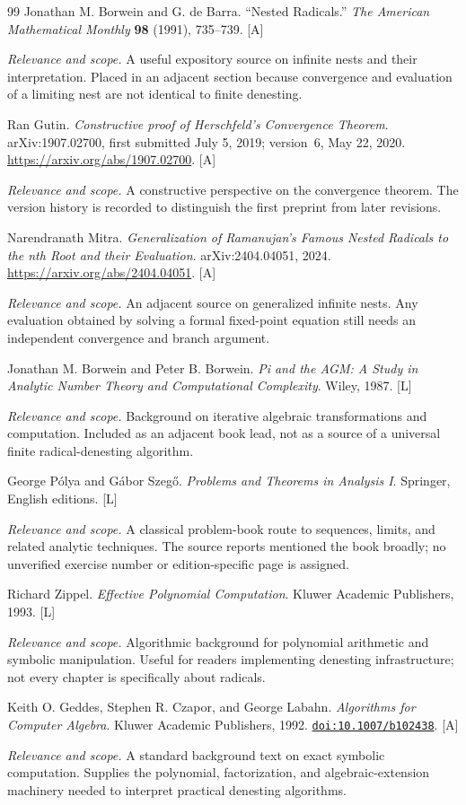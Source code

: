 \documentclass[11pt,oneside]{article}
\numberwithin{equation}{section}
\theoremstyle{definition}
\theoremstyle{remark}
\newcommand{\doi}[1]{\href{https://doi.org/#1}{\nolinkurl{doi:#1}}}
\newcommand{\status}[1]{\textsf{\small[#1]}}
\newcommand{\entrynote}[1]{\par\smallskip\noindent\emph{Relevance and scope.} #1}
\begin{document}
\begin{thebibliography}{99}
Jonathan M. Borwein and G. de Barra. ``Nested Radicals.'' \emph{The American Mathematical Monthly} \textbf{98} (1991), 735--739. \status{A}
\entrynote{A useful expository source on infinite nests and their interpretation. Placed in an adjacent section because convergence and evaluation of a limiting nest are not identical to finite denesting.}

Ran Gutin. \emph{Constructive proof of Herschfeld's Convergence Theorem}. arXiv:1907.02700, first submitted July 5, 2019; version~6, May 22, 2020. \url{https://arxiv.org/abs/1907.02700}. \status{A}
\entrynote{A constructive perspective on the convergence theorem. The version history is recorded to distinguish the first preprint from later revisions.}

Narendranath Mitra. \emph{Generalization of Ramanujan's Famous Nested Radicals to the nth Root and their Evaluation}. arXiv:2404.04051, 2024. \url{https://arxiv.org/abs/2404.04051}. \status{A}
\entrynote{An adjacent source on generalized infinite nests. Any evaluation obtained by solving a formal fixed-point equation still needs an independent convergence and branch argument.}

Jonathan M. Borwein and Peter B. Borwein. \emph{Pi and the AGM: A Study in Analytic Number Theory and Computational Complexity}. Wiley, 1987. \status{L}
\entrynote{Background on iterative algebraic transformations and computation. Included as an adjacent book lead, not as a source of a universal finite radical-denesting algorithm.}

George P\'olya and G\'abor Szeg\H{o}. \emph{Problems and Theorems in Analysis I}. Springer, English editions. \status{L}
\entrynote{A classical problem-book route to sequences, limits, and related analytic techniques. The source reports mentioned the book broadly; no unverified exercise number or edition-specific page is assigned.}

Richard Zippel. \emph{Effective Polynomial Computation}. Kluwer Academic Publishers, 1993. \status{L}
\entrynote{Algorithmic background for polynomial arithmetic and symbolic manipulation. Useful for readers implementing denesting infrastructure; not every chapter is specifically about radicals.}

Keith O. Geddes, Stephen R. Czapor, and George Labahn. \emph{Algorithms for Computer Algebra}. Kluwer Academic Publishers, 1992. \doi{10.1007/b102438}. \status{A}
\entrynote{A standard background text on exact symbolic computation. Supplies the polynomial, factorization, and algebraic-extension machinery needed to interpret practical denesting algorithms.}


\end{thebibliography}
\end{document}
